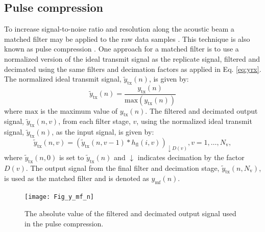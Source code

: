 \documentclass[preprint,12pt,TurnOnLineNumbers]{JASAnew}
\newcommand{\samplesymt}{n}
\newcommand{\genidxsym}{i}
\newcommand{\stagesym}{v}
\newcommand{\nstages}{N_{\textrm{v}}}
\newcommand{\ytx}{y_{\textrm{tx}}}
\newcommand{\ytxnorm}{\tilde{y}_{\textrm{tx}}}
\newcommand{\ymf}{y_{\textrm{mf}}}
\newcommand{\decfac}{D}
\newcommand{\hfl}{h_{\textrm{fl}}}
\begin{document}
\subsection{Pulse compression}
To increase signal-to-noise ratio and resolution along the acoustic beam a matched filter may be applied to the raw data samples \citep{turin1960}. This technique is also known as pulse compression \citep{klauder1960}. One approach for a matched filter is to use a normalized version of the ideal transmit signal as the replicate signal, filtered and decimated using the same filters and decimation factors as applied in Eq. \ref{eq:yrx}. The normalized ideal transmit signal, $\ytxnorm(\samplesymt)$, is given by:
%
\begin{equation}
\label{eq:ytxnorm}
\ytxnorm(\samplesymt) = \frac{\ytx(\samplesymt)}{\textrm{max}(\ytx(\samplesymt))}\end{equation}
%
where $\textrm{max}$ is the maximum value of $\ytx(\samplesymt)$. The filtered and decimated output signal, $\ytxnorm(\samplesymt,\stagesym)$, from each filter stage, $\stagesym$, using the normalized ideal transmit signal, $\ytxnorm(\samplesymt)$, as the input signal, is given by:
%
\begin{equation}
\label{eq:FilterStagesTX}
\ytxnorm(\samplesymt,\stagesym) = \left( \ytxnorm(\samplesymt,\stagesym-1) * \hfl(\genidxsym,\stagesym) \right)_{\downarrow \decfac(\stagesym)}, 
\stagesym = 1,\ldots,\nstages,
\end{equation}
%
where $\ytxnorm(\samplesymt,0)$ is set to $\ytxnorm(\samplesymt)$ and $\downarrow$ indicates decimation by the factor $\decfac(\stagesym)$. The output signal from the final filter and decimation stage, $\ytxnorm(\samplesymt,\nstages)$, is used as the matched filter and is denoted as $\ymf(\samplesymt)$.

\begin{figure}
\texttt{[image: Fig\_y\_mf\_n]}
\caption{\label{fi:ytx} The absolute value of the filtered and decimated output signal used in the pulse compression.}
\end{figure}
\end{document}
